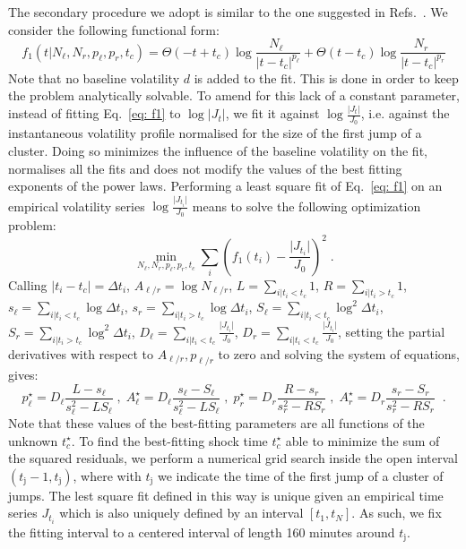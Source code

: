 \documentclass[amsmath,amssymb,aps,pre,floatfix,twocolumn,superscriptaddress]{revtex4}
\begin{document}
The secondary procedure we adopt is similar to the one suggested in Refs.~\cite{sornette_books,sornette_youtube}. We consider the following functional form:
\begin{equation}\label{eq: f1}
f_1(t \vert N_{\ell},N_r,p_{\ell},p_r,t_c) = \Theta(-t+t_{c}) \log \frac{N_{\ell} \;}{\vert t-t_{c} \vert^{p_{\ell}}} + \Theta(t-t_{c}) \log \frac{N_r \;}{\vert t-t_{c} \vert^{p_r}}
\end{equation}
Note that no baseline volatility $d$ is added to the fit. This is done in order to keep the problem analytically solvable. To amend for this lack of a constant parameter, instead of fitting Eq.~\ref{eq: f1} to $\log \vert J_t\vert$, we fit it against $\log \frac{\vert J_t\vert}{J_0}$, i.e. against the instantaneous volatility profile normalised for the size of the first jump of a cluster. Doing so minimizes the influence of the baseline volatility on the fit, normalises all the fits and does not modify the values of the best fitting exponents of the power laws. Performing a least square fit of Eq.~\ref{eq: f1} on an empirical volatility series $\log \frac{\vert J_{t_i}\vert}{J_0}$ means to solve the following optimization problem:
\[
\min_{N_{\ell},N_r,p_{\ell},p_r,t_c} \sum_i \left( f_1(t_i)-\frac{\vert J_{t_i}\vert}{J_0} \right)^2 \; .
\]
Calling $\vert t_i-t_{c} \vert= \Delta t_i$, $A_{\ell/r} = \log N_{\ell/r}$, $L = \sum_{i \vert t_i<t_{c}} 1$, $R = \sum_{i \vert t_i>t_{c}} 1$, $s_{\ell} = \sum_{i \vert t_i<t_{c}} \log \Delta t_i$, $s_r = \sum_{i \vert t_i>t_{c}} \log \Delta t_i$, $S_{\ell} = \sum_{i \vert t_i<t_{c}} \log^2 \Delta t_i$, $S_r = \sum_{i \vert t_i>t_{c}} \log^2 \Delta t_i$, $D_{\ell} = \sum_{i \vert t_i<t_{c}} \frac{\vert J_{t_i}\vert}{J_0}$, $D_r = \sum_{i \vert t_i<t_{c}} \frac{\vert J_{t_i}\vert}{J_0}$, setting the partial derivatives with respect to $A_{\ell/r}, p_{\ell/r}$ to zero and solving the system of equations, gives:
\[
p^\star_{\ell} = D_{\ell} \frac{L - s_{\ell}}{s^2_{\ell} - L S_{\ell}} \; , \; A^\star_{\ell} = D_{\ell} \frac{s_{\ell} - S_{\ell}}{s^2_{\ell} - L S_{\ell}} \; , \; p^\star_r = D_r \frac{R - s_r}{s^2_r - R S_r} \; , \; A^\star_r = D_r \frac{s_r - S_r}{s^2_r - R S_r} \;\; .
\]
Note that these values of the best-fitting parameters are all functions of the unknown $t^\star_c$. To find the best-fitting shock time $t^\star_c$ able to minimize the sum of the squared residuals, we perform a numerical grid search inside the open interval $(t_{\text{j}}-1, t_{\text{j}})$, where with $t_{\text{j}}$ we indicate the time of the first jump of a cluster of jumps. The lest square fit defined in this way is unique given an empirical time series $J_{t_i}$ which is also uniquely defined by an interval $[t_1,t_N]$. As such, we fix the fitting interval to a centered interval of length 160 minutes around $t_{\text{j}}$.
\end{document}
